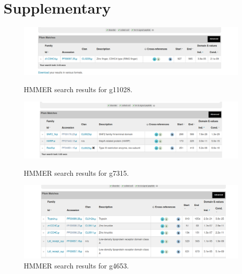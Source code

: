\documentclass{article}
\begin{document}
  
  \newpage
 \section{Supplementary}
  \begin{figure}[h!]
 	\centering
 	\includegraphics[scale=0.5]{1} 
 	\caption{ HMMER search results for g11028. } 
 	\includegraphics[scale=0.5]{2}
 	\caption{  HMMER search results for g7315. }
 	\includegraphics[scale=0.5]{3}
 	\caption{  HMMER search results for g4653. }
 	\label{screens}
 \end{figure}
 
\end{document}
